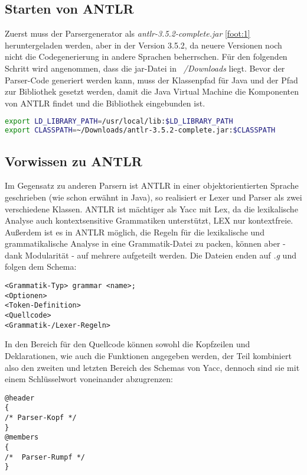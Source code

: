 \subsection{Starten von ANTLR}
Zuerst muss der Parsergenerator als \textit{antlr-3.5.2-complete.jar} \ref{foot:1} heruntergeladen werden, aber in der Version 3.5.2, da neuere Versionen noch nicht die Codegenerierung in andere Sprachen beherrschen.
Für den folgenden Schritt wird angenommen, dass die jar-Datei in \textit{~/Downloads} liegt.
Bevor der Parser-Code generiert werden kann, muss der Klassenpfad für Java und der Pfad zur Bibliothek gesetzt werden, damit die Java Virtual Machine die Komponenten von ANTLR findet und die Bibliothek eingebunden ist.
\begin{lstlisting}[language=Bash]
export LD_LIBRARY_PATH=/usr/local/lib:$LD_LIBRARY_PATH
export CLASSPATH=~/Downloads/antlr-3.5.2-complete.jar:$CLASSPATH
\end{lstlisting}

\subsection{Vorwissen zu ANTLR}
Im Gegensatz zu anderen Parsern ist ANTLR in einer objektorientierten Sprache geschrieben (wie schon erwähnt in Java), so realisiert er Lexer und Parser als zwei verschiedene Klassen. ANTLR ist mächtiger als Yacc mit Lex, da die lexikalische Analyse auch kontextsensitive Grammatiken unterstützt, LEX nur kontextfreie.
Außerdem ist es in ANTLR möglich, die Regeln für die lexikalische und grammatikalische Analyse in eine Grammatik-Datei zu packen, können aber - dank Modularität - auf mehrere aufgeteilt werden. Die Dateien enden auf \textit{.g} und folgen dem Schema:\cite{antlr}
\begin{lstlisting}
<Grammatik-Typ> grammar <name>;
<Optionen>
<Token-Definition>
<Quellcode>
<Grammatik-/Lexer-Regeln>
\end{lstlisting}

In den Bereich für den Quellcode können sowohl die Kopfzeilen und Deklarationen, wie auch die Funktionen angegeben werden, der Teil kombiniert also den zweiten und letzten Bereich des Schemas von Yacc, dennoch sind sie mit einem Schlüsselwort voneinander abzugrenzen:
\begin{lstlisting}
@header
{
/* Parser-Kopf */
}
@members
{
/*  Parser-Rumpf */
}
\end{lstlisting}


